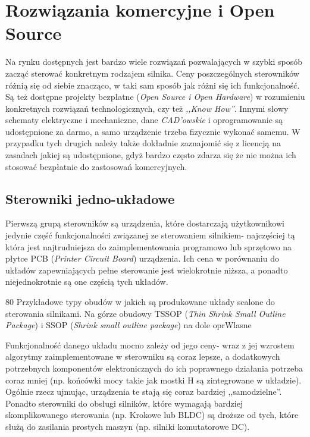 \section{Rozwiązania komercyjne i Open Source}

Na rynku dostępnych jest bardzo wiele rozwiązań pozwalających w szybki sposób zacząć sterować konkretnym rodzajem silnika. Ceny poszczególnych sterowników różnią się od siebie znacząco, w taki sam sposób jak różni się ich funkcjonalność. Są też dostępne projekty bezpłatne ({\it Open Source i Open Hardware}) w rozumieniu konkretnych rozwiązań technologicznych, czy też {\it ,,Know How''}. Innymi słowy schematy elektryczne i mechaniczne, dane {\it CAD'owskie} i oprogramowanie są udostępnione za darmo, a samo urządzenie trzeba fizycznie wykonać samemu. W przypadku tych drugich należy także dokładnie zaznajomić się z licencją na zasadach jakiej są udostępnione, gdyż bardzo często zdarza się że nie można ich stosować bezpłatnie do zastosowań komercyjnych. 

\subsection{Sterowniki jedno-układowe}

Pierwszą grupą sterowników są urządzenia, które dostarczają użytkownikowi jedynie część funkcjonalności związanej ze sterowaniem silnikiem- najczęściej tą która jest najtrudniejsza do zaimplementowania programowo lub sprzętowo na płytce PCB ({\it Printer Circuit Board}) urządzenia. Ich cena w porównaniu do układów zapewniających pełne sterowanie jest wielokrotnie niższa, a ponadto niejednokrotnie są one częścią tych układów. 

	{80}
	{Przykładowe typy obudów w jakich są produkowane układy scalone do sterowania silnikami. Na górze obudowy TSSOP ({\it Thin Shrink Small Outline Package}) i SSOP ({\it Shrink small outline package}) na dole}
	{oprWlasne}

Funkcjonalność danego układu mocno zależy od jego ceny- wraz z jej wzrostem algorytmy zaimplementowane w sterowniku są coraz lepsze, a dodatkowych potrzebnych komponentów elektronicznych do ich poprawnego działania potrzeba coraz mniej (np. końcówki mocy takie jak mostki H są zintegrowane w układzie). Ogólnie rzecz ujmując, urządzenia te stają się coraz bardziej ,,samodzielne''. Ponadto sterowniki do obsługi silników, które wymagają bardziej skomplikowanego sterowania (np. Krokowe lub BLDC) są droższe od tych, które służą do zasilania prostych maszyn (np. silniki komutatorowe DC). 

